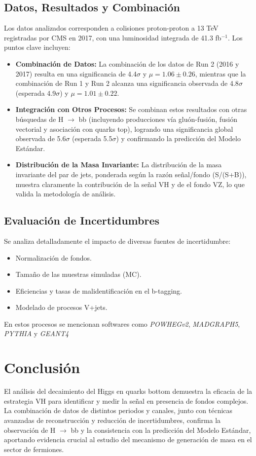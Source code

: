 \documentclass[a4paper,11pt]{article}
\begin{document}
\subsection*{Datos, Resultados y Combinación}
Los datos analizados corresponden a colisiones proton-proton a 13 TeV registradas por CMS en 2017, con una luminosidad integrada de 41.3 fb$^{-1}$. Los puntos clave incluyen:
\begin{itemize}    
    \item \textbf{Combinación de Datos:}  
    La combinación de los datos de Run 2 (2016 y 2017) resulta en una significancia de 4.4$\sigma$ y $\mu = 1.06 \pm 0.26$, mientras que la combinación de Run 1 y Run 2 alcanza una significancia observada de 4.8$\sigma$ (esperada 4.9$\sigma$) y $\mu = 1.01 \pm 0.22$.
    
    \item \textbf{Integración con Otros Procesos:}  
    Se combinan estos resultados con otras búsquedas de H $\rightarrow$ bb (incluyendo producciones vía gluón-fusión, fusión vectorial y asociación con quarks top), logrando una significancia global observada de 5.6$\sigma$ (esperada 5.5$\sigma$) y confirmando la predicción del Modelo Estándar.
    
    \item \textbf{Distribución de la Masa Invariante:}  
    La distribución de la masa invariante del par de jets, ponderada según la razón señal/fondo (S/(S+B)), muestra claramente la contribución de la señal VH y de el fondo VZ, lo que valida la metodología de análisis.
\end{itemize}

\subsection*{Evaluación de Incertidumbres}
Se analiza detalladamente el impacto de diversas fuentes de incertidumbre:
\begin{itemize}
    \item Normalización de fondos.
    \item Tamaño de las muestras simuladas (MC).
    \item Eficiencias y tasas de malidentificación en el b-tagging.
    \item Modelado de procesos V+jets.
\end{itemize}
En estos procesos se mencionan softwares como \textit{POWHEGv2}, \textit{MADGRAPH5}, \textit{PYTHIA} y \textit{GEANT4}

\section{Conclusión}
El análisis del decaimiento del Higgs en quarks bottom demuestra la eficacia de la estrategia VH para identificar y medir la señal en presencia de fondos complejos. La combinación de datos de distintos periodos y canales, junto con técnicas avanzadas de reconstrucción y reducción de incertidumbres, confirma la observación de H $\rightarrow$ bb y la consistencia con la predicción del Modelo Estándar, aportando evidencia crucial al estudio del mecanismo de generación de masa en el sector de fermiones.
\end{document}
